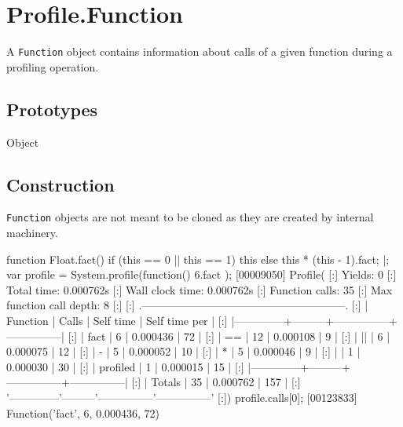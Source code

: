 
\section{Profile.Function}

A \lstinline|Function| object contains information about calls of a
given function during a profiling operation.

\subsection{Prototypes}

\begin{refObjects}
\item[Object]
\end{refObjects}

\subsection{Construction}

\lstinline|Function| objects are not meant to be cloned as they are
created by  internal machinery.

\begin{urbiscript}
function Float.fact()
{
  if (this == 0 || this == 1)
    this
  else
    this * (this - 1).fact;
}|;
var profile = System.profile(function() { 6.fact });
[00009050] Profile(
[:]  Yields: 0
[:]  Total time: 0.000762s
[:]  Wall clock time: 0.000762s
[:]  Function calls: 35
[:]  Max function call depth: 8
[:]
[:]  .--------------------------------------------------------.
[:]  |   Function   |  Calls  |   Self time   | Self time per |
[:]  |--------------+---------+---------------+---------------|
[:]  |         fact |       6 |      0.000436 |            72 |
[:]  |           == |      12 |      0.000108 |             9 |
[:]  |           || |       6 |      0.000075 |            12 |
[:]  |            - |       5 |      0.000052 |            10 |
[:]  |            * |       5 |      0.000046 |             9 |
[:]  |              |       1 |      0.000030 |            30 |
[:]  |     profiled |       1 |      0.000015 |            15 |
[:]  |--------------+---------+---------------+---------------|
[:]  |       Totals |      35 |      0.000762 |           157 |
[:]  '--------------'---------'---------------'---------------'
[:])
profile.calls[0];
[00123833] Function('fact', 6, 0.000436, 72)
\end{urbiscript}

